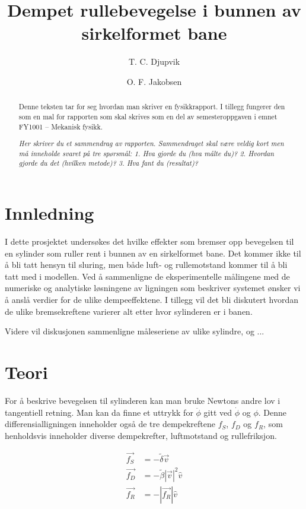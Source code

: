 \documentclass[5p]{elsarticle}
\title{Dempet rullebevegelse i bunnen av sirkelformet bane}
\author[fysikk]{T. C. Djupvik}
\author[fysikk]{O. F. Jakobsen}
\begin{document}
\begin{abstract}
Denne teksten tar for seg hvordan man skriver en fysikkrapport. I tillegg fungerer
den som en mal for rapporten som skal skrives som en del av semesteroppgaven i emnet FY1001 – Mekanisk fysikk.

\textit{Her skriver du et sammendrag av rapporten. Sammendraget skal være veldig kort
men må inneholde svaret på tre spørsmål: 1. Hva gjorde du (hva målte du)? 2. Hvordan 
gjorde du det (hvilken metode)? 3. Hva fant du (resultat)?}
\end{abstract}

\maketitle %

\section{Innledning}
I dette prosjektet undersøkes det hvilke effekter som bremser opp bevegelsen 
til en sylinder som ruller rent i bunnen av en sirkelformet bane. Det kommer ikke til å 
bli tatt hensyn til sluring, men både luft- og rullemotstand kommer til å bli tatt med i modellen.
Ved å sammenligne de eksperimentelle målingene med de numeriske og analytiske løsningene av 
ligningen som beskriver systemet ønsker vi å anslå verdier for de ulike dempeeffektene. 
I tillegg vil det bli diskutert hvordan de ulike bremsekreftene varierer alt etter hvor sylinderen 
er i banen.
\par
Videre vil diskusjonen sammenligne måleseriene av ulike sylindre, og ...

\section{Teori}

For å beskrive bevegelsen til sylinderen kan man bruke Newtons andre lov i tangentiell retning.
Man kan da finne et uttrykk for \(\ddot{\phi}\) gitt ved \(\dot{\phi}\) og \(\phi\). 
Denne differensialligningen inneholder også de tre dempekreftene \(f_S\), \(f_D\) og \(f_R\), 
som henholdsvis inneholder diverse dempekrefter, luftmotstand og rullefriksjon.

\begin{align}
	\vec{f_S} & = -\tilde{\delta} \vec{v} 			\\
	\vec{f_D} & = -\tilde{\beta}|\vec{v}|^2\hat{v}  \\
	\vec{f_R} & = -|\vec{f_R}|\hat{v}				
\end{align}
\end{document}
